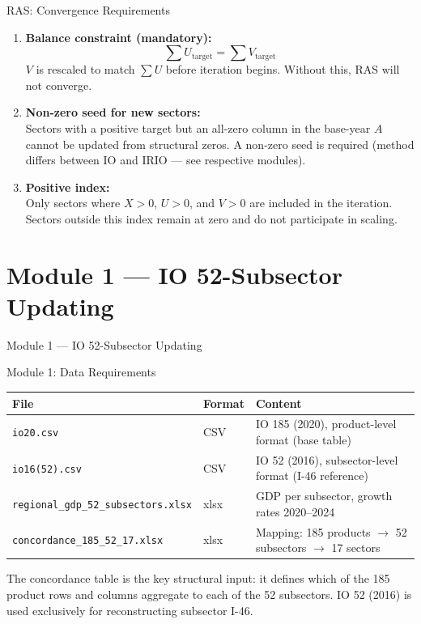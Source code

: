 \documentclass[aspectratio=169]{beamer}
\begin{document}
\begin{frame}{RAS: Convergence Requirements}
\begin{enumerate}
  \item \textbf{Balance constraint (mandatory):}
  \[
  \sum U_{\text{target}} = \sum V_{\text{target}}
  \]
  $V$ is rescaled to match $\sum U$ before iteration begins. Without this, RAS will not converge.

  \item \textbf{Non-zero seed for new sectors:}\\
  Sectors with a positive target but an all-zero column in the base-year $A$ cannot be updated from structural zeros. A non-zero seed is required (method differs between IO and IRIO --- see respective modules).

  \item \textbf{Positive index:}\\
  Only sectors where $X > 0$, $U > 0$, and $V > 0$ are included in the iteration. Sectors outside this index remain at zero and do not participate in scaling.
\end{enumerate}
\end{frame}

\section{Module 1 --- IO 52-Subsector Updating}

\begin{frame}{Module 1 --- IO 52-Subsector Updating}
\tableofcontents[currentsection]
\end{frame}

\begin{frame}{Module 1: Data Requirements}
\begin{center}
\renewcommand{\arraystretch}{1.3}
\scriptsize
\begin{tabular}{@{}p{5.0cm}p{1.0cm}p{6.6cm}@{}}
\toprule
\textbf{File} & \textbf{Format} & \textbf{Content} \\
\midrule
\texttt{io20.csv} & CSV & IO 185 (2020), product-level format (base table) \\
\texttt{io16(52).csv} & CSV & IO 52 (2016), subsector-level format (I-46 reference) \\
\texttt{regional\_gdp\_52\_subsectors.xlsx} & xlsx & GDP per subsector, growth rates 2020--2024 \\
\texttt{concordance\_185\_52\_17.xlsx} & xlsx & Mapping: 185 products $\to$ 52 subsectors $\to$ 17 sectors \\
\bottomrule
\end{tabular}
\end{center}

\medskip
\small
The concordance table is the key structural input: it defines which of the 185 product rows and columns aggregate to each of the 52 subsectors. IO 52 (2016) is used exclusively for reconstructing subsector I-46.
\end{frame}
\end{document}
